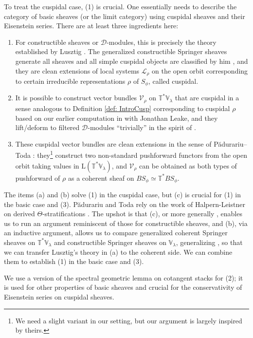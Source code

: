 \documentclass{amsart}
\theoremstyle{definition}
\theoremstyle{remark}
\numberwithin{equation}{section}
\newcommand{\mc}{\mathcal}
\newcommand{\V}{\mathbb{V}}
\newcommand{\T}{\mathbb{T}}
\newcommand{\mrL}{\mathrm{L}}
\begin{document}
To treat the cuspidal case, (1) is crucial. One essentially needs to describe the category of basic sheaves (or the limit category) using cuspidal sheaves and their Eisenstein series. There are at least three ingredients here:
\begin{enumerate}
    \item[(a)] For constructible sheaves or $\mc D$-modules, this is precisely the theory established by Lusztig \cite{LusztigGraded}. The generalized constructible Springer sheaves generate all sheaves and all simple cuspidal objects are classified by him \cite{LusztigIntersection}, and they are clean extensions of local systems $\mc L_\rho$ on the open orbit corresponding to certain irreducible representations $\rho$ of $S_\phi$, called cuspidal. 
    \item[(b)] It is possible to construct vector bundles $\mc V_\rho$ on $\T^*\V_\lambda$ that are cuspidal in a sense analogous to Definition \ref{def: IntroCusp} corresponding to cuspidal $\rho$ based on our earlier computation in \cite{BMKL} with Jonathan Leake, and they lift/deform to filtered $\mc D$-modules ``trivially'' in the spirit of \cite{BCHNconstructible}. 
    \item[(c)] These cuspidal vector bundles are clean extensions in the sense of P\u{a}durariu--Toda \cite{PTDolbeault}: they\footnote{We need a slight variant in our setting, but our argument is largely inspired by theirs.} construct two non-standard pushforward functors from the open orbit taking values in $\mrL (\T^*\V_\lambda)$, and $\mc V_\rho$ can be obtained as both types of pushforward of $\rho$ as a coherent sheaf on $BS_\phi \simeq \T^* BS_\phi$. 
\end{enumerate}
The items (a) and (b) solve (1) in the cuspidal case, but (c) is crucial for (1) in the basic case and (3). P\u{a}durariu and Toda rely on the work of Halpern-Leistner on derived $\Theta$-stratifications \cite{HalpernLeistner}. The upshot is that (c), or more generally \cite{HalpernLeistner}, enables us to run an argument reminiscent of those for constructible sheaves, and (b), via an inductive argument, allows us to compare generalized coherent Springer sheaves on $\T^*\V_\lambda$ and constructible Springer sheaves on $\V_\lambda$, generalizing \cite{BCHNconstructible}, so that we can transfer Lusztig's theory in (a) to the coherent side. We can combine them to establish (1) in the basic case and (3). 

We use a version of the spectral geometric lemma on cotangent stacks for (2); it is used for other properties of basic sheaves and crucial for the conservativity of Eisenstein series on cuspidal sheaves. 
\end{document}
